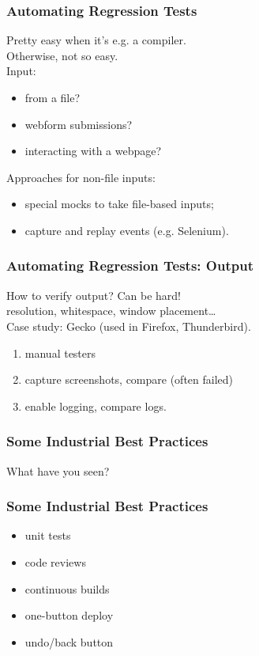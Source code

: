 \documentclass{beamer}
\newenvironment{changemargin}[1]{%
  \begin{list}{}{%
    \setlength{\topsep}{0pt}%
    \setlength{\leftmargin}{#1}%
    \setlength{\rightmargin}{1em}
    \setlength{\listparindent}{\parindent}%
    \setlength{\itemindent}{\parindent}%
    \setlength{\parsep}{\parskip}%
  }%
  \item[]}{\end{list}}
\begin{document}
\begin{frame}
  \frametitle{Automating Regression Tests}
  \begin{changemargin}{1em}
    \Large
    Pretty easy when it's e.g. a compiler. \\
    Otherwise, not so easy.\\[1em]
    Input:
    \begin{itemize}
    \item from a file?
    \item webform submissions?
    \item interacting with a webpage?\\[.5em]
    \end{itemize}
    Approaches for non-file inputs:
    \begin{itemize}
      \item special mocks to take file-based inputs;
      \item capture and replay events (e.g. Selenium).
    \end{itemize}
  \end{changemargin}
\end{frame}

\begin{frame}
  \frametitle{Automating Regression Tests: Output}
  \begin{changemargin}{1em}
    \Large
    How to verify output? Can be hard!\\
    resolution, whitespace, window placement\ldots\\[1em]

    Case study: Gecko (used in Firefox, Thunderbird).
    \begin{enumerate}
    \item manual testers
    \item capture screenshots, compare (often failed)
    \item enable logging, compare logs.
    \end{enumerate}
  \end{changemargin}
\end{frame}

\begin{frame}
  \frametitle{Some Industrial Best Practices}
  \begin{changemargin}{2em}
    \Large
    What have you seen?
  \end{changemargin}
\end{frame}

\begin{frame}
  \frametitle{Some Industrial Best Practices}
  \begin{changemargin}{1em}
    \Large
    \begin{itemize}
    \item unit tests
    \item code reviews
    \item continuous builds
    \item one-button deploy
    \item undo/back button
    \end{itemize}
  \end{changemargin}
\end{frame}
\end{document}
